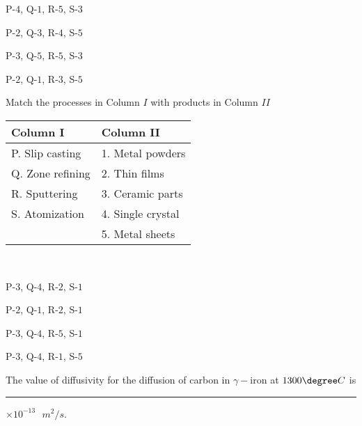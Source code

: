 \hfill{}
\begin{enumerate}
\begin{multicols}{2}
\item P-$4$, Q-$1$, R-$5$, S-$3$
\item P-$2$, Q-$3$, R-$4$, S-$5$
\item P-$3$, Q-$5$, R-$5$, S-$3$
\item P-$2$, Q-$1$, R-$3$, S-$5$
\end{multicols}
\end{enumerate}

\item Match the processes in Column $I$ with products in Column $II$
\\\begin{table}[h!]    
  \centering
  \begin{tabular}{| p{4cm} | p{6cm} |}
    \hline
    \textbf{Column I} & \textbf{Column II} \\
    \hline
    P. Slip casting & 1. Metal powders \\
    \hline
    Q. Zone refining & 2. Thin films \\
    \hline
    R. Sputtering & 3. Ceramic parts \\
    \hline
    S. Atomization & 4. Single crystal \\
    \hline
    & 5. Metal sheets \\
    \hline
\end{tabular}
\end{table}\\

\hfill{}
\begin{enumerate}
\begin{multicols}{2}
\item P-$3$, Q-$4$, R-$2$, S-$1$
\item P-$2$, Q-$1$, R-$2$, S-$1$
\item P-$3$, Q-$4$, R-$5$, S-$1$
\item P-$3$, Q-$4$, R-$1$, S-$5$
\end{multicols}
\end{enumerate}

\item The value of diffusivity  for the diffusion of carbon  in $\gamma-$iron at $1300{{\degree}} C$ is \rule{2.5cm}{0.4pt}$\times 10^{-13}\text{ }m^2/s$. 

